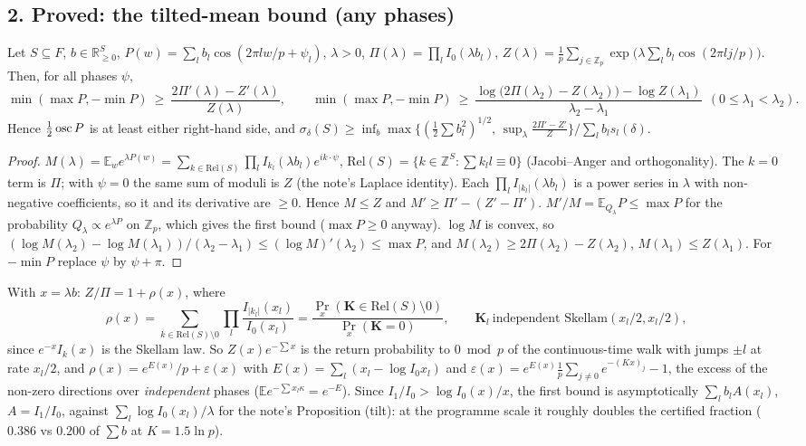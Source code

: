 \documentclass[11pt]{article}
\theoremstyle{remark}\newtheorem{remark}[theorem]{Remark}
\begin{document}
\subsection*{2. Proved: the tilted-mean bound (any phases)}
\begin{lemma}\label{tm}
Let $S\subseteq F$, $b\in\mathbb R^S_{\ge0}$, $P(w)=\sum_lb_l\cos(2\pi lw/p+\psi_l)$, $\lambda>0$,
$\Pi(\lambda)=\prod_lI_0(\lambda b_l)$, $Z(\lambda)=\frac1p\sum_{j\in\mathbb Z_p}\exp\big(\lambda\sum_lb_l\cos(2\pi lj/p)\big)$.  Then, for all phases $\psi$,
\[\min(\max P,-\min P)\ \ge\ \frac{2\Pi'(\lambda)-Z'(\lambda)}{Z(\lambda)},\qquad
\min(\max P,-\min P)\ \ge\ \frac{\log\big(2\Pi(\lambda_2)-Z(\lambda_2)\big)-\log Z(\lambda_1)}{\lambda_2-\lambda_1}\ \ (0\le\lambda_1<\lambda_2).\]
Hence $\frac12\operatorname{osc} P$ is at least either right-hand side, and $\sigma_\delta(S)\ge\inf_b\max\{(\frac12\sum b_l^2)^{1/2},\,\sup_\lambda\frac{2\Pi'-Z'}{Z}\}/\sum_lb_ls_l(\delta)$.
\end{lemma}
\begin{proof}
$M(\lambda)=\mathbb E_we^{\lambda P(w)}=\sum_{k\in\mathrm{Rel}(S)}\prod_lI_{k_l}(\lambda b_l)e^{ik\cdot\psi}$, $\mathrm{Rel}(S)=\{k\in\mathbb Z^S:\sum k_ll\equiv0\}$ (Jacobi--Anger and
orthogonality).  The $k=0$ term is $\Pi$; with $\psi=0$ the same sum of moduli is $Z$ (the note's Laplace identity).  Each
$\prod_lI_{|k_l|}(\lambda b_l)$ is a power series in $\lambda$ with non-negative coefficients, so it and its derivative are $\ge0$.  Hence $M\le Z$ and
$M'\ge\Pi'-(Z'-\Pi')$.  $M'/M=\mathbb E_{Q_\lambda}P\le\max P$ for the probability $Q_\lambda\propto e^{\lambda P}$ on $\mathbb Z_p$, which gives the first bound
($\max P\ge0$ anyway).  $\log M$ is convex, so $(\log M(\lambda_2)-\log M(\lambda_1))/(\lambda_2-\lambda_1)\le(\log M)'(\lambda_2)\le\max P$, and
$M(\lambda_2)\ge2\Pi(\lambda_2)-Z(\lambda_2)$, $M(\lambda_1)\le Z(\lambda_1)$.  For $-\min P$ replace $\psi$ by $\psi+\pi$.
\end{proof}
With $x=\lambda b$: $Z/\Pi=1+\rho(x)$, where
\[\rho(x)=\sum_{k\in\mathrm{Rel}(S)\setminus0}\prod_l\frac{I_{|k_l|}(x_l)}{I_0(x_l)}=\frac{\Pr_x(\mathbf K\in\mathrm{Rel}(S)\setminus0)}{\Pr_x(\mathbf K=0)},\qquad
\mathbf K_l\ \text{independent Skellam}(x_l/2,x_l/2),\]
since $e^{-x}I_k(x)$ is the Skellam law.  So $Z(x)e^{-\sum x}$ is the return probability to $0\bmod p$ of the continuous-time walk with jumps $\pm l$ at rate
$x_l/2$, and $\rho(x)=e^{E(x)}/p+\varepsilon(x)$ with $E(x)=\sum_l(x_l-\log I_0x_l)$ and
$\varepsilon(x)=e^{E(x)}\frac1p\sum_{j\ne0}e^{-(Kx)_j}-1$, the excess of the non-zero directions over \emph{independent} phases ($\mathbb Ee^{-\sum x_l\kappa}=e^{-E}$).
Since $I_1/I_0>\log I_0(x)/x$, the first bound is asymptotically $\sum_lb_lA(x_l)$, $A=I_1/I_0$, against $\sum_l\log I_0(x_l)/\lambda$ for the note's
Proposition (tilt): at the programme scale it roughly doubles the certified fraction ($0.386$ vs $0.200$ of $\sum b$ at $K=1.5\ln p$).
\end{document}
